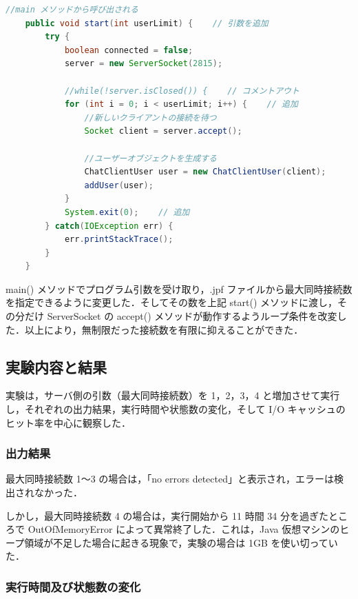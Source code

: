 \documentclass[a4j,12pt]{jarticle}
\begin{document}
\begin{lstlisting}[label=src:server-loop, caption=サーバプログラムの接続制御,language=Java]
    //main メソッドから呼び出される
    public void start(int userLimit) {    // 引数を追加
        try {
            boolean connected = false;
            server = new ServerSocket(2815);
            
            //while(!server.isClosed()) {    // コメントアウト
            for (int i = 0; i < userLimit; i++) {    // 追加
                //新しいクライアントの接続を待つ
                Socket client = server.accept();

                //ユーザーオブジェクトを生成する
                ChatClientUser user = new ChatClientUser(client);
                addUser(user);
            }
            System.exit(0);    // 追加
        } catch(IOException err) {
            err.printStackTrace();
        }
    }
\end{lstlisting}

main() メソッドでプログラム引数を受け取り，.jpf ファイルから最大同時接続数を指定できるように変更した．そしてその数を上記 start() メソッドに渡し，その分だけ ServerSocket の accept() メソッドが動作するようループ条件を改変した．以上により，無制限だった接続数を有限に抑えることができた．

\subsection{実験内容と結果}

実験は，サーバ側の引数（最大同時接続数）を 1，2，3，4 と増加させて実行し，それぞれの出力結果，実行時間や状態数の変化，そして I/O キャッシュのヒット率を中心に観察した．

\subsubsection{出力結果}

最大同時接続数 1〜3 の場合は，「no errors detected」と表示され，エラーは検出されなかった．

しかし，最大同時接続数 4 の場合は，実行開始から 11 時間 34 分を過ぎたところで OutOfMemoryError によって異常終了した．これは，Java 仮想マシンのヒープ領域が不足した場合に起きる現象で，実験の場合は 1GB を使い切っていた．

\subsubsection{実行時間及び状態数の変化}
\end{document}
